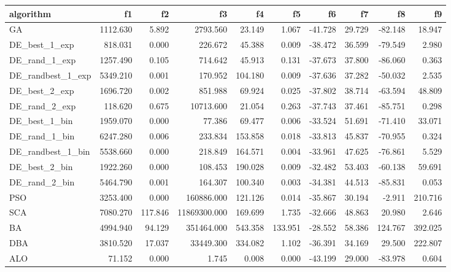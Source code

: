 \documentclass[12pt]{article}
\begin{document}
    \begin{table}[H]
    \centering
    \tiny 
    
    \begin{adjustbox}{width=1\textwidth}

\begin{tabular}{lrrrrrrrrr}
    \toprule
    algorithm &       f1 &      f2 &           f3 &      f4 &      f5 &      f6 &     f7 &      f8 &      f9 \\
    \midrule
    GA & 1112.630 &   5.892 &     2793.560 &  23.149 &   1.067 & -41.728 & 29.729 & -82.148 &  18.947 \\
    DE\_best\_1\_exp &  818.031 &   0.000 &      226.672 &  45.388 &   0.009 & -38.472 & 36.599 & -79.549 &   2.980 \\
    DE\_rand\_1\_exp & 1257.490 &   0.105 &      714.642 &  45.913 &   0.131 & -37.673 & 37.800 & -86.060 &   0.363 \\
    DE\_randbest\_1\_exp & 5349.210 &   0.001 &      170.952 & 104.180 &   0.009 & -37.636 & 37.282 & -50.032 &   2.535 \\
    DE\_best\_2\_exp & 1696.720 &   0.002 &      851.988 &  69.924 &   0.025 & -37.802 & 38.714 & -63.594 &  48.809 \\
    DE\_rand\_2\_exp &  118.620 &   0.675 &    10713.600 &  21.054 &   0.263 & -37.743 & 37.461 & -85.751 &   0.298 \\
    DE\_best\_1\_bin & 1959.070 &   0.000 &       77.386 &  69.477 &   0.006 & -33.524 & 51.691 & -71.410 &  33.071 \\
    DE\_rand\_1\_bin & 6247.280 &   0.006 &      233.834 & 153.858 &   0.018 & -33.813 & 45.837 & -70.955 &   0.324 \\
    DE\_randbest\_1\_bin & 5538.660 &   0.000 &      218.849 & 164.571 &   0.004 & -33.961 & 47.625 & -76.861 &   5.529 \\
    DE\_best\_2\_bin & 1922.260 &   0.000 &      108.453 & 190.028 &   0.009 & -32.482 & 53.403 & -60.138 &  59.691 \\
    DE\_rand\_2\_bin & 5464.790 &   0.001 &      164.307 & 100.340 &   0.003 & -34.381 & 44.513 & -85.831 &   0.053 \\
    PSO & 3253.400 &   0.000 &   160886.000 & 121.126 &   0.014 & -35.867 & 30.194 &  -2.911 & 210.716 \\
    SCA & 7080.270 & 117.846 & 11869300.000 & 169.699 &   1.735 & -32.666 & 48.863 &  20.980 &   2.646 \\
    BA & 4994.940 &  94.129 &   351464.000 & 543.358 & 133.951 & -28.552 & 58.386 & 124.767 & 392.025 \\
    DBA & 3810.520 &  17.037 &    33449.300 & 334.082 &   1.102 & -36.391 & 34.169 &  29.500 & 222.807 \\
    ALO &   71.152 &   0.000 &        1.745 &   0.008 &   0.000 & -43.199 & 29.000 & -83.978 &   0.604 \\
    \bottomrule
\end{tabular}


\end{adjustbox}
\end{table}
\end{document}
